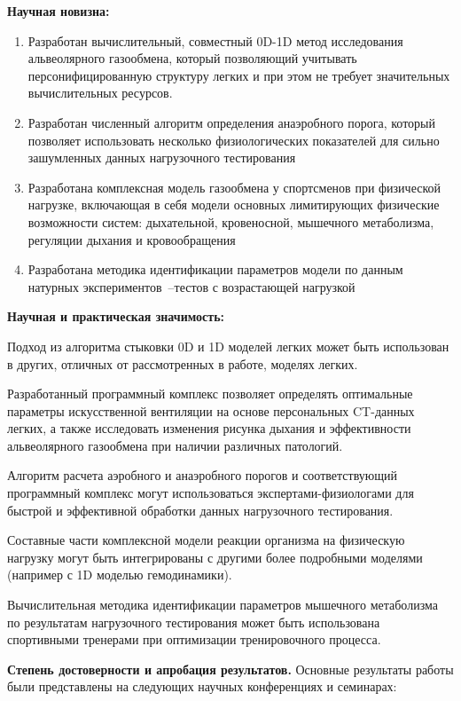 \textbf{Научная новизна:}
\begin{enumerate}
 \item 
Разработан вычислительный, совместный 0D-1D метод исследования альвеолярного газообмена, который позволяющий учитывать персонифицированную структуру легких и при этом не требует значительных вычислительных ресурсов.
 \item 
 Разработан численный алгоритм определения анаэробного порога, который позволяет использовать несколько физиологических показателей для сильно зашумленных данных нагрузочного тестирования
 \item
 Разработана комплексная модель газообмена у спортсменов при физической нагрузке, включающая в себя модели основных лимитирующих физические возможности систем: дыхательной, кровеносной, мышечного метаболизма, регуляции дыхания и кровообращения
 \item
 Разработана методика идентификации параметров модели по данным натурных экспериментов~--тестов с возрастающей нагрузкой
  
\end{enumerate}

\textbf{Научная и практическая значимость:} 

Подход из алгоритма стыковки 0D и 1D моделей легких может быть использован в  других, отличных от рассмотренных в работе, моделях легких.

Разработанный программный комплекс позволяет определять оптимальные параметры искусственной вентиляции на основе персональных CT-данных легких, а также исследовать изменения рисунка дыхания и эффективности альвеолярного газообмена при наличии различных патологий. 

Алгоритм расчета аэробного и анаэробного порогов и соответствующий программный комплекс могут использоваться экспертами-физиологами для быстрой и эффективной обработки данных нагрузочного тестирования.

Составные части комплексной модели реакции организма на физическую нагрузку могут быть интегрированы с другими более подробными моделями (например с 1D моделью гемодинамики).

Вычислительная методика идентификации параметров мышечного метаболизма по результатам нагрузочного тестирования может быть использована спортивными тренерами при оптимизации тренировочного процесса.

\textbf{Степень достоверности и апробация результатов.} Основные результаты работы были представлены на следующих научных конференциях и семинарах:

